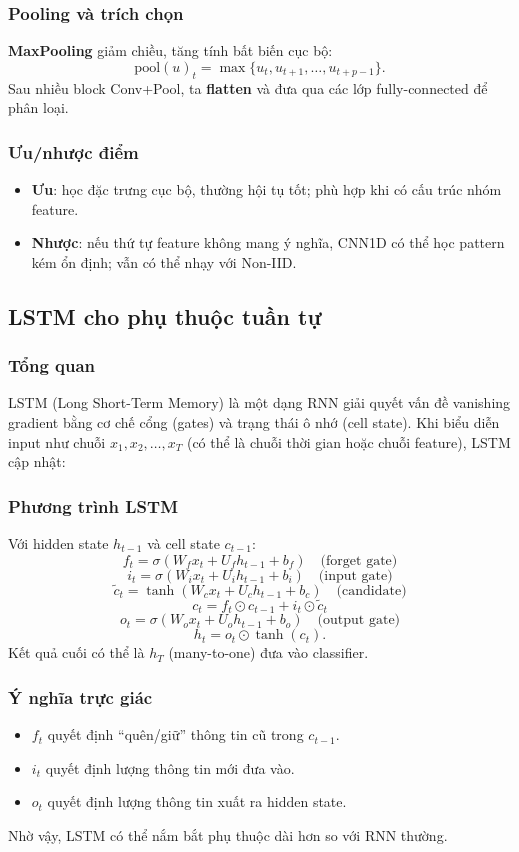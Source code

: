 \documentclass[12pt,a4paper]{article}
\begin{document}
\subsubsection{Pooling và trích chọn}
\textbf{MaxPooling} giảm chiều, tăng tính bất biến cục bộ:
\[
\text{pool}(u)_t = \max\{u_{t}, u_{t+1}, \dots, u_{t+p-1}\}.
\]
Sau nhiều block Conv+Pool, ta \textbf{flatten} và đưa qua các lớp fully-connected để phân loại.

\subsubsection{Ưu/nhược điểm}
\begin{itemize}
    \item \textbf{Ưu}: học đặc trưng cục bộ, thường hội tụ tốt; phù hợp khi có cấu trúc nhóm feature.
    \item \textbf{Nhược}: nếu thứ tự feature không mang ý nghĩa, CNN1D có thể học pattern kém ổn định; vẫn có thể nhạy với Non-IID.
\end{itemize}

\subsection{LSTM cho phụ thuộc tuần tự}

\subsubsection{Tổng quan}
LSTM (Long Short-Term Memory) là một dạng RNN giải quyết vấn đề vanishing gradient bằng cơ chế cổng (gates) và trạng thái ô nhớ (cell state). Khi biểu diễn input như chuỗi $x_1, x_2, \dots, x_T$ (có thể là chuỗi thời gian hoặc chuỗi feature), LSTM cập nhật:

\subsubsection{Phương trình LSTM}
Với hidden state $h_{t-1}$ và cell state $c_{t-1}$:
\[
f_t = \sigma(W_f x_t + U_f h_{t-1} + b_f) \quad \text{(forget gate)}
\]
\[
i_t = \sigma(W_i x_t + U_i h_{t-1} + b_i) \quad \text{(input gate)}
\]
\[
\tilde c_t = \tanh(W_c x_t + U_c h_{t-1} + b_c) \quad \text{(candidate)}
\]
\[
c_t = f_t \odot c_{t-1} + i_t \odot \tilde c_t
\]
\[
o_t = \sigma(W_o x_t + U_o h_{t-1} + b_o) \quad \text{(output gate)}
\]
\[
h_t = o_t \odot \tanh(c_t).
\]
Kết quả cuối có thể là $h_T$ (many-to-one) đưa vào classifier.

\subsubsection{Ý nghĩa trực giác}
\begin{itemize}
    \item $f_t$ quyết định ``quên/giữ'' thông tin cũ trong $c_{t-1}$.
    \item $i_t$ quyết định lượng thông tin mới đưa vào.
    \item $o_t$ quyết định lượng thông tin xuất ra hidden state.
\end{itemize}
Nhờ vậy, LSTM có thể nắm bắt phụ thuộc dài hơn so với RNN thường.
\end{document}
